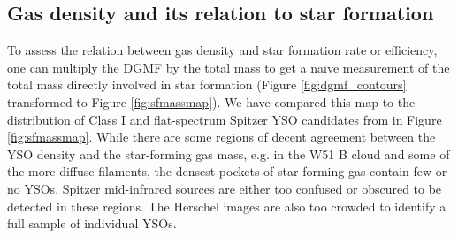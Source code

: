 \subsection{Gas density and its relation to star formation}
%

To assess the relation between gas density and star formation rate or
efficiency, one can multiply the DGMF by the total mass to get a naïve
measurement of the total mass directly involved in star formation (Figure
\ref{fig:dgmf_contours} transformed to Figure \ref{fig:sfmassmap}).  We have
compared this map to the distribution of Class I and flat-spectrum Spitzer YSO
candidates from \citet{Kang2009a} in Figure \ref{fig:sfmassmap}.  While there
are some regions of decent agreement between the YSO density and the
star-forming gas mass, e.g.  in the W51 B cloud and some of the more diffuse
filaments, the densest pockets of star-forming gas contain few or no YSOs.
Spitzer mid-infrared sources are either too confused or obscured to be detected
in these regions.  The Herschel images are also too crowded to identify a full
sample of individual YSOs.


